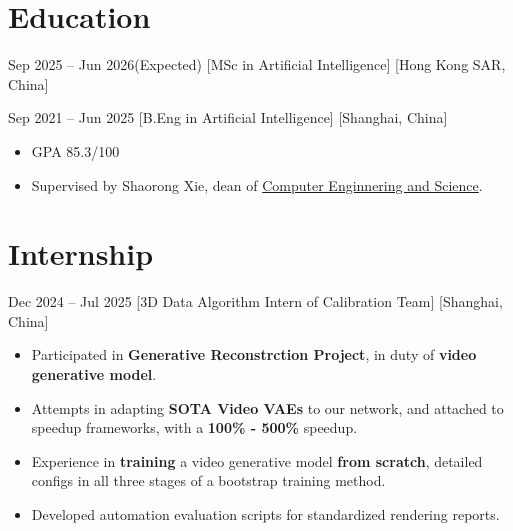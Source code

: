 \documentclass{chicv}
\begin{document}
\begin{basicinfo}
\end{basicinfo}


\section{Education}
  {Sep 2025 -- Jun 2026(Expected)}
  [MSc in Artificial Intelligence]
  [Hong Kong SAR, China]

  {Sep 2021 -- Jun 2025}
  [B.Eng in Artificial Intelligence]
  [Shanghai, China]
  \begin{itemize}
    \item GPA 85.3/100
    \item Supervised by Shaorong Xie, dean of \href{https://cs.shu.edu.cn/}{Computer Enginnering and Science}.
  \end{itemize}



\section{Internship}
{Dec 2024 -- Jul 2025}
  [3D Data Algorithm Intern of Calibration Team]
  [Shanghai, China]
  \begin{itemize}
    \item Participated in \textbf{Generative Reconstrction Project}, in duty of \textbf{video generative model}.
    \item Attempts in adapting \textbf{SOTA Video VAEs} to our network, and attached to speedup frameworks, with a \textbf{100\% - 500\%} speedup.
    \item Experience in \textbf{training} a video generative model \textbf{from scratch}, detailed configs in all three stages of a bootstrap training method.
    \item Developed automation evaluation scripts for standardized rendering reports. 
  \end{itemize}
\end{document}
